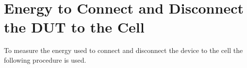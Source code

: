 %
%
%

\section{Energy to Connect and Disconnect the DUT to the Cell} \label{sec:performance_attach}

To measure the energy used to connect and disconnect the device to the cell the following procedure is used.

